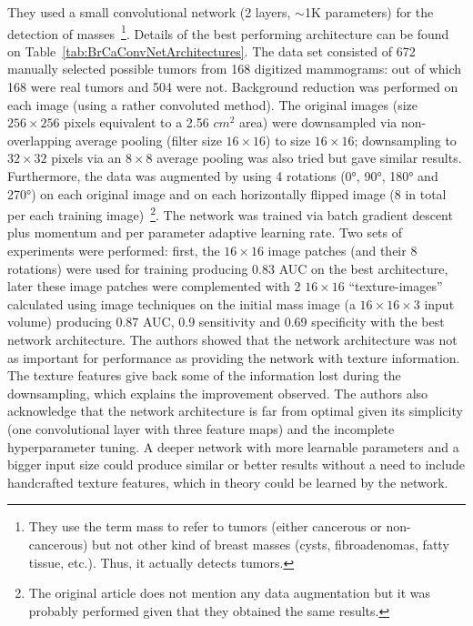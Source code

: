 They used a small convolutional network (2 layers, $\sim$1K parameters) for the detection of masses~\footnote{They use the term mass to refer to tumors (either cancerous or non-cancerous) but not other kind of breast masses (cysts, fibroadenomas, fatty tissue, etc.). Thus, it actually detects tumors.}. Details of the best performing architecture can be found on Table~\ref{tab:BrCaConvNetArchitectures}. The data set consisted of 672 manually selected possible tumors from 168 digitized mammograms: out of which 168 were real tumors and 504 were not. Background reduction was performed on each image (using a rather convoluted method). The original images (size $256 \times 256$ pixels equivalent to a 2.56 $cm^2$ area) were downsampled via non-overlapping average pooling (filter size $16 \times 16$) to size $16\times 16$; downsampling to $32 \times 32$ pixels via an $8 \times 8$ average pooling was also tried but gave similar results. Furthermore, the data was augmented by using 4 rotations (0°, 90°, 180° and 270°) on each original image and on each horizontally flipped image (8 in total per each training image)~\footnote{The original article does not mention any data augmentation but it was probably performed given that they obtained the same results.}. The network was trained via batch gradient descent plus momentum and per parameter adaptive learning rate. Two sets of experiments were performed: first, the $16 \times 16$ image patches (and their 8 rotations) were used for training producing 0.83 AUC on the best architecture, later these image patches were complemented with 2 $16 \times 16$ ``texture-images'' calculated using image techniques on the initial mass image (a $16\times 16 \times 3$ input volume) producing 0.87 AUC, 0.9 sensitivity and 0.69 specificity with the best network architecture. The authors showed that the network architecture was not as important for performance as providing the network with texture information. The texture features give back some of the information lost during the downsampling, which explains the improvement observed. The authors also acknowledge that the network architecture is far from optimal given its simplicity (one convolutional layer with three feature maps) and the incomplete hyperparameter tuning. A deeper network with more learnable parameters and a bigger input size could produce similar or better results without a need to include handcrafted texture features, which in theory could be learned by the network.

